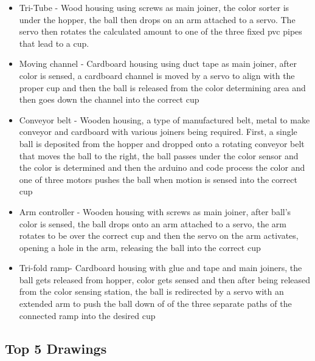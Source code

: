 \documentclass{article}
\begin{document}
\begin{itemize}
    \item Tri-Tube -  Wood housing using screws as main joiner, the color sorter is under the hopper, the ball then drops on an arm attached to a servo. The servo then rotates the calculated amount to one of the three fixed pvc pipes that lead to a cup.
    \item Moving channel -   Cardboard housing using duct tape as main joiner, after color is sensed, a cardboard channel is moved by a servo to align with the proper cup and then the ball is released from the color determining area and then goes down the channel into the correct cup
    \item Conveyor belt -  Wooden housing, a type of manufactured belt, metal to make conveyor and cardboard with various joiners being required. First, a single ball is deposited from the hopper and dropped onto a rotating conveyor belt that moves the ball to the right, the ball passes under the color sensor and the color is determined and then the arduino and code process the color and one of three motors pushes the ball when motion is sensed into the correct cup
    \item  Arm controller - Wooden housing with screws as main joiner, after ball’s color is sensed, the ball drops onto an arm attached to a servo, the arm rotates to be over the correct cup and then the servo on the arm activates, opening a hole in the arm, releasing the ball into the correct cup
    \item Tri-fold ramp- Cardboard housing with glue and tape and main joiners, the ball gets released from hopper, color gets sensed and then after being released from the color sensing station, the ball is redirected by a servo with an extended arm to push the ball down of of the three separate paths of the connected ramp into the desired cup
\end{itemize}

\subsection{Top 5 Drawings}
\end{document}
